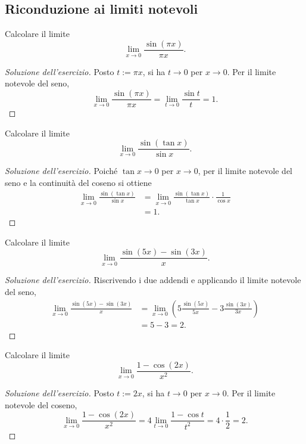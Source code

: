 \subsection{Riconduzione ai limiti notevoli}
\label{sec:esercizi-limiti-limiti-notevoli}

\begin{exercise}
\label{ex:limiti-foglio-2311-18}
Calcolare il limite
\[
  \lim_{x\to0}\frac{\sin(\pi x)}{\pi x}.
\]
\end{exercise}
\begin{proof}[Soluzione dell'esercizio]
Posto $t:=\pi x$, si ha $t\to0$ per $x\to0$.
Per il limite notevole del seno,
\[
  \lim_{x\to0}\frac{\sin(\pi x)}{\pi x}
  =\lim_{t\to0}\frac{\sin t}{t}=1.
\]
\end{proof}

\begin{exercise}
\label{ex:limiti-foglio-2311-19}
Calcolare il limite
\[
  \lim_{x\to0}\frac{\sin(\tan x)}{\sin x}.
\]
\end{exercise}
\begin{proof}[Soluzione dell'esercizio]
Poiché $\tan x\to0$ per $x\to0$, per il limite notevole
del seno e la continuità del coseno si ottiene
\[
\begin{aligned}
  \lim_{x\to0}\frac{\sin(\tan x)}{\sin x}
    &=\lim_{x\to0}\frac{\sin(\tan x)}{\tan x}\cdot\frac1{\cos x}\\
    &=1.
\end{aligned}
\]
\end{proof}

\begin{exercise}
\label{ex:limiti-foglio-2311-20}
Calcolare il limite
\[
  \lim_{x\to0}\frac{\sin(5x)-\sin(3x)}{x}.
\]
\end{exercise}
\begin{proof}[Soluzione dell'esercizio]
Riscrivendo i due addendi e applicando il limite notevole del seno,
\[
\begin{aligned}
  \lim_{x\to0}\frac{\sin(5x)-\sin(3x)}{x}
    &=\lim_{x\to0}\left(5\frac{\sin(5x)}{5x}
      -3\frac{\sin(3x)}{3x}\right)\\
    &=5-3=2.
\end{aligned}
\]
\end{proof}

\clearpage

\begin{exercise}
\label{ex:limiti-foglio-2311-24}
Calcolare il limite
\[
  \lim_{x\to0}\frac{1-\cos(2x)}{x^2}.
\]
\end{exercise}
\begin{proof}[Soluzione dell'esercizio]
Posto $t:=2x$, si ha $t\to0$ per $x\to0$.
Per il limite notevole del coseno,
\[
  \lim_{x\to0}\frac{1-\cos(2x)}{x^2}
  =4\lim_{t\to0}\frac{1-\cos t}{t^2}
  =4\cdot\frac12=2.
\]
\end{proof}
